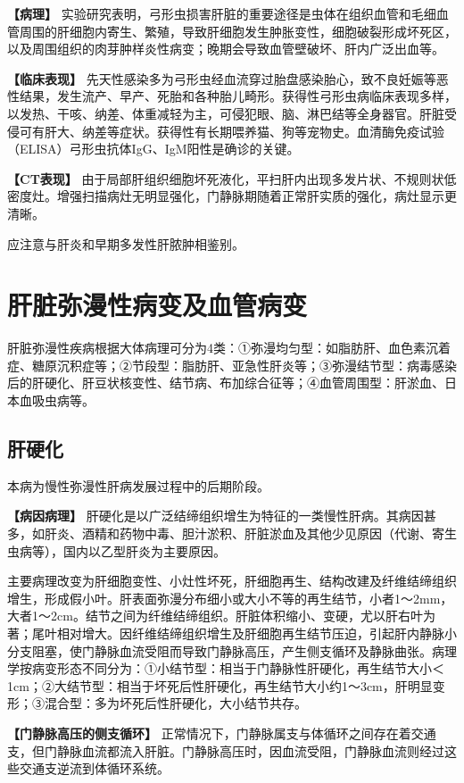 \textbf{【病理】}
实验研究表明，弓形虫损害肝脏的重要途径是虫体在组织血管和毛细血管周围的肝细胞内寄生、繁殖，导致肝细胞发生肿胀变性，细胞破裂形成坏死区，以及周围组织的肉芽肿样炎性病变；晚期会导致血管壁破坏、肝内广泛出血等。

\textbf{【临床表现】}
先天性感染多为弓形虫经血流穿过胎盘感染胎心，致不良妊娠等恶性结果，发生流产、早产、死胎和各种胎儿畸形。获得性弓形虫病临床表现多样，以发热、干咳、纳差、体重减轻为主，可侵犯眼、脑、淋巴结等全身器官。肝脏受侵可有肝大、纳差等症状。获得性有长期喂养猫、狗等宠物史。血清酶免疫试验（ELISA）弓形虫抗体IgG、IgM阳性是确诊的关键。

\textbf{【CT表现】}
由于局部肝组织细胞坏死液化，平扫肝内出现多发片状、不规则状低密度灶。增强扫描病灶无明显强化，门静脉期随着正常肝实质的强化，病灶显示更清晰。

应注意与肝炎和早期多发性肝脓肿相鉴别。

\section{肝脏弥漫性病变及血管病变}

肝脏弥漫性疾病根据大体病理可分为4类：①弥漫均匀型：如脂肪肝、血色素沉着症、糖原沉积症等；②节段型：脂肪肝、亚急性肝炎等；③弥漫结节型：病毒感染后的肝硬化、肝豆状核变性、结节病、布加综合征等；④血管周围型：肝淤血、日本血吸虫病等。

\subsection{肝硬化}

本病为慢性弥漫性肝病发展过程中的后期阶段。

\textbf{【病因病理】}
肝硬化是以广泛结缔组织增生为特征的一类慢性肝病。其病因甚多，如肝炎、酒精和药物中毒、胆汁淤积、肝脏淤血及其他少见原因（代谢、寄生虫病等），国内以乙型肝炎为主要原因。

主要病理改变为肝细胞变性、小灶性坏死，肝细胞再生、结构改建及纤维结缔组织增生，形成假小叶。肝表面弥漫分布细小或大小不等的再生结节，小者1～2mm，大者1～2cm。结节之间为纤维结缔组织。肝脏体积缩小、变硬，尤以肝右叶为著；尾叶相对增大。因纤维结缔组织增生及肝细胞再生结节压迫，引起肝内静脉小分支阻塞，使门静脉血流受阻而导致门静脉高压，产生侧支循环及静脉曲张。病理学按病变形态不同分为：①小结节型：相当于门静脉性肝硬化，再生结节大小＜1cm；②大结节型：相当于坏死后性肝硬化，再生结节大小约1～3cm，肝明显变形；③混合型：多为坏死后性肝硬化，大小结节共存。

\textbf{【门静脉高压的侧支循环】}
正常情况下，门静脉属支与体循环之间存在着交通支，但门静脉血流都流入肝脏。门静脉高压时，因血流受阻，门静脉血流则经过这些交通支逆流到体循环系统。

